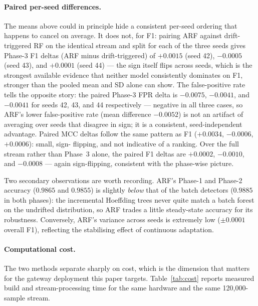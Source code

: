 \documentclass[11pt,a4paper]{article}
\begin{document}
\paragraph{Paired per-seed differences.} The means above could in
principle hide a consistent per-seed ordering that happens to cancel on
average. It does not, for F1: pairing ARF against drift-triggered RF on
the identical stream and split for each of the three seeds gives
Phase-3 F1 deltas (ARF minus drift-triggered) of $+0.0015$ (seed 42),
$-0.0005$ (seed 43), and $+0.0001$ (seed 44) --- the sign itself flips
across seeds, which is the strongest available evidence that neither
model consistently dominates on F1, stronger than the pooled mean and
SD alone can show. The false-positive rate tells the opposite story:
the paired Phase-3 FPR delta is $-0.0075$, $-0.0041$, and $-0.0041$ for
seeds 42, 43, and 44 respectively --- negative in all three cases, so
ARF's lower false-positive rate (mean difference $-0.0052$) is not an
artifact of averaging over seeds that disagree in sign; it is a
consistent, seed-independent advantage. Paired MCC deltas follow the
same pattern as F1 ($+0.0034$, $-0.0006$, $+0.0006$): small, sign-
flipping, and not indicative of a ranking. Over the full stream rather
than Phase~3 alone, the paired F1 deltas are $+0.0002$, $-0.0010$, and
$-0.0008$ --- again sign-flipping, consistent with the phase-wise
picture.

Two secondary observations are worth recording. ARF's Phase-1 and
Phase-2 accuracy ($0.9865$ and $0.9855$) is slightly \emph{below} that
of the batch detectors ($0.9885$ in both phases): the incremental
Hoeffding trees never quite match a batch forest on the undrifted
distribution, so ARF trades a little steady-state accuracy for its
robustness. Conversely, ARF's variance across seeds is extremely low
($\pm 0.0001$ overall F1), reflecting the stabilising effect of
continuous adaptation.

\paragraph{Computational cost.} The two methods separate sharply on
cost, which is the dimension that matters for the gateway deployment
this paper targets. Table~\ref{tab:cost} reports measured build and
stream-processing time for the same hardware and the same 120{,}000-sample
stream.
\end{document}
